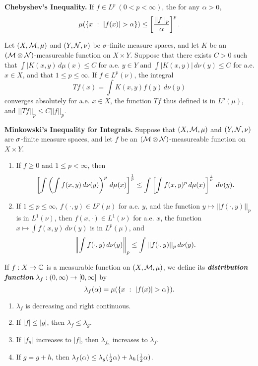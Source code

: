 \textbf{Chebyshev's Inequality.} If $f\in L^p\ (0<p<\infty)$, the for any $\alpha > 0$,
\[\mu(\{x\ :\ |f(x)| > \alpha\}) \leq \left[\frac{||f||_p}{\alpha}\right]^p.\]

\vs
\setcounter{thm}{17}

\begin{thm}
Let $(X,\mathcal{M},\mu)$ and $(Y,\mathcal{N},\nu)$ be $\sigma$-finite measure spaces, and let $K$ be an $(\mathcal{M}\otimes\mathcal{N})$-measureable function on $X\times Y$. Suppose that there exists $C > 0$ such that $\int|K(x,y)\,d\mu(x) \leq C$ for a.e. $y\in Y$ and $\int |K(x,y)|\,d\nu(y)\leq C$ for a.e. $x\in X$, and that $1\leq p\leq \infty$. If $f\in L^p(\nu)$, the integral
\[Tf(x) = \int K(x,y)f(y)\, d\nu(y)\]
converges absolutely for a.e. $x\in X$, the function $Tf$ thus defined is in $L^p(\mu)$, and $||Tf||_p\leq C||f||_p$.
\end{thm}

\vs

\textbf{Minkowski's Inequality for Integrals.} Suppose that $(X,\mathcal{M},\mu)$ and $(Y,\mathcal{N},\nu)$ are $\sigma$-finite measure spaces, and let $f$ be an $(\mathcal{M}\otimes\mathcal{N})$-measureable function on $X\times Y$.
\begin{enumerate}
    \item If $f\geq 0$ and $1 \leq p < \infty$, then
    \[\left[\int\left( \int f(x,y)\,d\nu(y)\right)^p\,d\mu(x)\right]^\frac{1}{p}\leq\int\left[\int f(x,y)^p\,d\mu(x)\right]^\frac{1}{p}\,d\nu(y).\]
    \item If $1 \leq p \leq \infty$, $f(\cdot, y)\in L^p(\mu)$ for a.e. $y$, and the function $y\mapsto ||f(\cdot, y)||_p$ is in $L^1(\nu)$, then $f(x,\cdot)\in L^1(\nu)$ for a.e. $x$, the function $x\mapsto \int f(x,y)\,d\nu(y)$ is in $L^p(\mu)$, and
    \[\left\|\int f(\cdot,y)\,d\nu(y)\right\|_p\leq\int ||f(\cdot, y)||_p\,d\nu(y).\]
\end{enumerate}

\vs

\dfn If $f:X\rightarrow \mathbb{C}$ is a measurable function on $(X, \mathcal{M}, \mu)$, we define its \textbf{\textit{distribution function}} $\lambda_f:(0,\infty) \rightarrow [0,\infty]$ by
\[\lambda_f(\alpha) = \mu(\{x\ :\ |f(x)| > \alpha\}).\]

\vs
\setcounter{thm}{21}
\newpage

\begin{prop}\nl
\begin{enumerate}
    \item $\lambda_f$ is decreasing and right continuous.
    \item If $|f| \leq |g|$, then $\lambda_f\leq \lambda_g$.
    \item If $|f_n|$ increases to $|f|$, then $\lambda_{f_n}$ increases to $\lambda_f$.
    \item If $g = g + h$, then $\lambda_f(\alpha) \leq \lambda_g(\frac{1}{2}\alpha) + \lambda_h(\frac{1}{2}\alpha)$.
\end{enumerate}
\end{prop}

